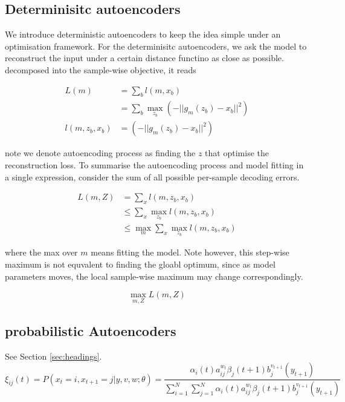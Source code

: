 \documentclass{article}
\begin{document}
\subsection{Determinisitc autoencoders}

    We introduce deterministic autoencoders 
    to keep the idea simple under an optimisation framework.
    For the determinisitc autoencoders, 
    we ask the model to reconstruct the input under a 
    certain distance functino as close as possible.
    decomposed into the sample-wise objective, it reads

    \begin{align*} 
	L(m) &= \sum_b l(m,x_b) \\
	     &= \sum_b \max_{z_b} \left(-||g_m(z_b) - x_b||^2  
		 \right) \\ 
	l(m,z_b,x_b) &= \left(-||g_m(z_b) - x_b||^2  
		 \right) 
	\end{align*}
	
	note we denote autoencoding process as finding the $z$ 
	that optimise the reconstruction loss. To summarise the autoencoding
	process and model fitting in a single expression,
	consider the sum of all possible per-sample decoding errors.

    \begin{align*} 
	L(m,Z) &= \sum_x l(m,z_b,x_b)  \\
	&\leq \sum_x \max_{z_b} l(m,z_b,x_b)  
	\\
	&\leq \max_{m} \sum_x \max_{z_b} l(m,z_b,x_b) 
	\end{align*}

	where the max over $m$ means fitting the model.
    Note however, this step-wise maximum is not 
    equvalent to finding the 
    gloabl optimum, since as model parameters moves,
    the local sample-wise maximum may change correspondingly.
    
    $$
    \max_{m,Z} L(m,Z)
    $$

	\label{sec:headings}
    

\subsection{probabilistic Autoencoders}
See Section \ref{sec:headings}.
\lipsum[5]
\begin{equation}
	\xi _{ij}(t)=P(x_{t}=i,x_{t+1}=j|y,v,w;\theta)= {\frac {\alpha _{i}(t)a^{w_t}_{ij}\beta _{j}(t+1)b^{v_{t+1}}_{j}(y_{t+1})}{\sum _{i=1}^{N} \sum _{j=1}^{N} \alpha _{i}(t)a^{w_t}_{ij}\beta _{j}(t+1)b^{v_{t+1}}_{j}(y_{t+1})}}
\end{equation}
\end{document}
